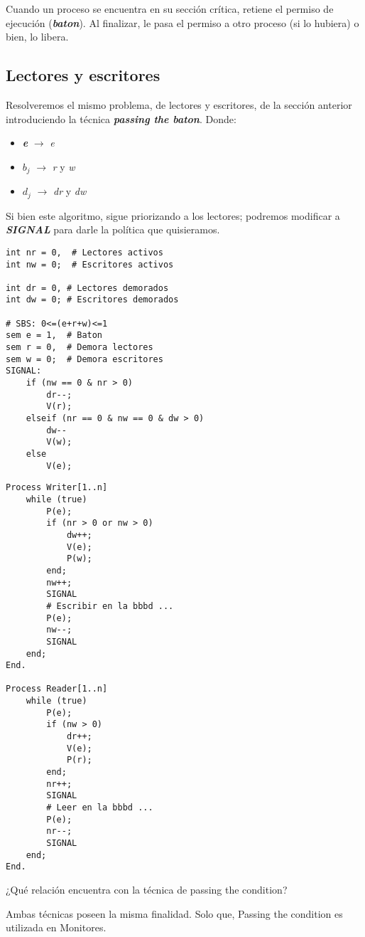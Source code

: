 \documentclass[a4paper, 10pt]{report}
\begin{document}
Cuando un proceso se encuentra en su sección crítica, retiene el permiso de ejecución (\textbf{\emph{baton}}). Al finalizar, le pasa el permiso a otro proceso (si lo hubiera) o bien, lo libera.

\subsection{Lectores y escritores}

Resolveremos el mismo problema, de lectores y escritores, de la sección anterior introduciendo la técnica \textbf{\emph{passing the baton}}. Donde:

\begin{itemize}
	\item \textbf{\emph{e}} $\rightarrow$ \emph{e}
	\item \textbf{\emph{$b_j$}} $\rightarrow$ \emph{r} y \emph{w}
	\item \textbf{\emph{$d_j$}} $\rightarrow$ \emph{dr} y \emph{dw}
\end{itemize}

Si bien este algoritmo, sigue priorizando a los lectores; podremos modificar a \textbf{\emph{SIGNAL}} para darle la política que quisieramos.

\noindent
\begin{minipage}{\textwidth}
\begin{lstlisting}[multicols=2]
int nr = 0,  # Lectores activos
int nw = 0;  # Escritores activos
	
int dr = 0, # Lectores demorados
int dw = 0; # Escritores demorados

# SBS: 0<=(e+r+w)<=1
sem e = 1,  # Baton
sem r = 0,  # Demora lectores
sem w = 0;  # Demora escritores
SIGNAL:
	if (nw == 0 & nr > 0)
		dr--;
		V(r);
	elseif (nr == 0 & nw == 0 & dw > 0)
		dw--
		V(w);
	else
		V(e);
\end{lstlisting}
\begin{lstlisting}[multicols=2, firstnumber=20]
Process Writer[1..n]
	while (true)
		P(e);
		if (nr > 0 or nw > 0)
			dw++;
			V(e);
			P(w);
		end;
		nw++;
		SIGNAL
		# Escribir en la bbbd ...
		P(e);
		nw--;
		SIGNAL
	end;
End.

Process Reader[1..n]
	while (true)
		P(e);
		if (nw > 0)
			dr++;
			V(e);
			P(r);
		end;
		nr++;
		SIGNAL
		# Leer en la bbbd ...
		P(e);
		nr--;
		SIGNAL
	end;
End.
\end{lstlisting}
\end{minipage}

\begin{basic_box}
	 ¿Qué relación encuentra con la técnica de passing the condition?

	Ambas técnicas poseen la misma finalidad. Solo que, Passing the condition es utilizada en Monitores.
\end{basic_box}
\end{document}
